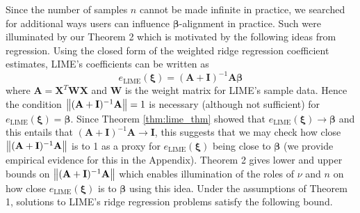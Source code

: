 \documentclass[mnsc,blindrev]{informs3}
\begin{document}
             
            Since the number of samples $n$ cannot be made infinite in practice, we searched for additional ways users can influence $\boldsymbol{\beta}$-alignment in practice. Such were illuminated by our Theorem 2 which is motivated by the following ideas from regression. Using the closed form of the weighted ridge regression coefficient estimates, LIME's coefficients can be written as
            \begin{equation*}
                e_{\text{LIME}}(\boldsymbol{\xi})=(\mathbf{A} + \mathbf{I})^{-1}\mathbf{A} \boldsymbol{\beta}
            \end{equation*}
            where $\mathbf{A} = \mathbf{X}^T \mathbf{W}\mathbf{X}$ and $\mathbf{W}$ is the weight matrix for LIME's sample data.  Hence the condition $\norm{(\mathbf{A} + \mathbf{I})^{-1}\mathbf{A}}=1$ is necessary (although not sufficient) for $e_{\text{LIME}}(\boldsymbol{\xi}) = \boldsymbol{\beta}$. Since Theorem \ref{thm:lime_thm} showed that $e_{\text{LIME}}(\boldsymbol{\xi})\rightarrow \boldsymbol{\beta}$ and this entails that $(\mathbf{A} + \mathbf{I})^{-1}\mathbf{A}\rightarrow \mathbf{I}$, this suggests that we may check how close $\norm{(\mathbf{A} + \mathbf{I})^{-1}\mathbf{A}}$ is to 1 as a proxy for $e_{\text{LIME}}(\boldsymbol{\xi})$ being close to $\boldsymbol{\beta}$ (we provide empirical evidence for this in the Appendix). Theorem 2 gives lower and upper bounds on $\norm{(\mathbf{A} + \mathbf{I})^{-1}\mathbf{A}}$ which enables illumination of the roles of $\nu$ and $n$ on how close $e_{\text{LIME}}(\boldsymbol{\xi})$ is to $\boldsymbol{\beta}$ using this idea.  Under the assumptions of Theorem 1, solutions to LIME's ridge regression problems satisfy the following bound.
            
\end{document}
